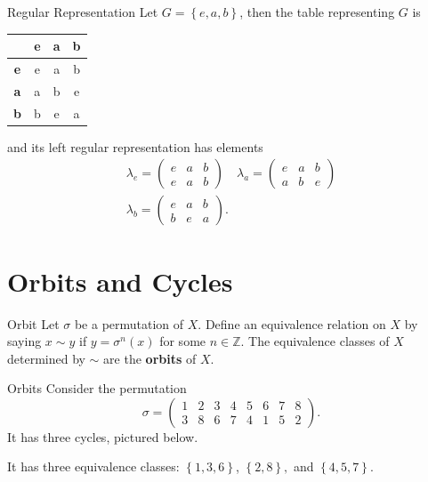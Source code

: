 \documentclass[10pt]{report}
\begin{document}
\begin{ex}{Regular Representation}{}
Let $G=\left\{ e,a,b \right\}$, then the table representing $G$ is
\begin{center}
	\begin{tabular}{c||c|c|c}
		& \textbf{e}  & \textbf{a}  & \textbf{b}  \\
		\hline
		\hline
		\textbf{e}  & e & a & b \\
		\hline
		\textbf{a}  & a & b & e \\
		\hline
		\textbf{b}  & b & e & a
	\end{tabular}
\end{center}
and its left regular representation has elements
\begin{gather*}
	\lambda_e =
	\begin{pmatrix}
		e & a & b \\
		e & a & b
	\end{pmatrix} \quad
	\lambda_a =
	\begin{pmatrix}
		e & a & b \\
		a & b & e
	\end{pmatrix} \\
	\lambda_b =
	\begin{pmatrix}
		e & a & b \\
		b & e & a
	\end{pmatrix}.
\end{gather*}
\end{ex}



\section{Orbits and Cycles}

\begin{defn}{Orbit}{}
	Let $\sigma$ be a permutation of $X$. Define an equivalence relation on $X$ by saying $x \sim y$ if $y=\sigma^n(x)$ for some $n \in \mathbb{Z}$. The equivalence classes of $X$ determined by $\sim$ are the \textbf{orbits} of $X$.
\end{defn}

\begin{ex}{Orbits}{}
Consider the permutation
\[
\sigma=
\begin{pmatrix}
	1&2&3&4&5&6&7&8\\
	3&8&6&7&4&1&5&2
\end{pmatrix}.
\] It has three cycles, pictured below.
\begin{center}

\end{center}

It has three equivalence classes: $\left\{ 1,3,6 \right\}$, $\left\{ 2, 8 \right\},$ and $\left\{ 4,5,7 \right\}$.
\end{ex}
\end{document}
